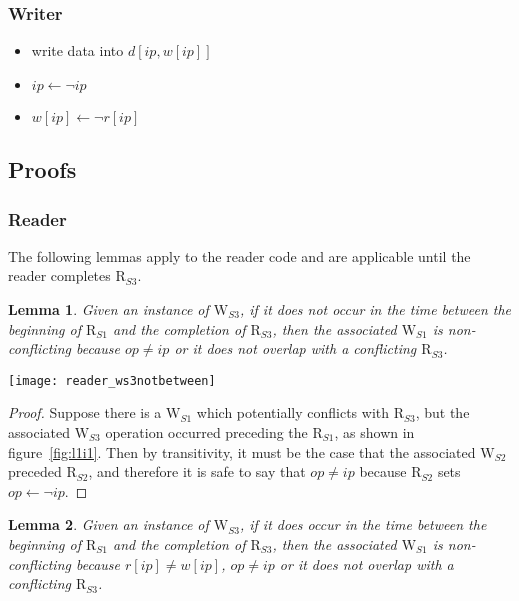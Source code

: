 \documentclass{article}
\newtheorem{lemma}{Lemma}
\newcommand\RS[1]{\ensuremath{\text{R}_{S#1}}}
\newcommand\WS[1]{\ensuremath{\text{W}_{S#1}}}
\newcommand\W[1]{\ensuremath{w\left[#1\right]}}
\newcommand\R[1]{\ensuremath{r\left[#1\right]}}
\newcommand\data[1]{\ensuremath{d\left[#1\right]}}
\newcommand\ip{\ensuremath{ip}}
\newcommand\op{\ensuremath{op}}
\begin{document}
\subsubsection{Writer}
\begin{itemize}
\item[\WS 1] write data into $\data{\ip,\W{\ip}}$
\item[\WS 2] $\ip\gets\neg\ip$
\item[\WS 3] $\W{\ip}\gets\neg{\R{\ip}}$
\end{itemize}

\subsection{Proofs}
\subsubsection{Reader}
The following lemmas apply to the reader code and are applicable until
the reader completes \RS3.

\begin{lemma}\label{lma:ws3notbetween}
  Given an instance of \WS3, if it does not occur in the time between
  the beginning of \RS1 and the completion of \RS3, then the
  associated \WS1 is non-conflicting because $\op\neq\ip$ or it does
  not overlap with a conflicting \RS3.
\end{lemma}

\begin{figure*}[h]
  \centering
  \texttt{[image: reader\_ws3notbetween]}
  \caption{\WS 3 does not occur between \RS 1 and completion of \RS 3}
  \label{fig:l1i1}
\end{figure*}

\begin{proof}
  Suppose there is a \WS1 which potentially conflicts with \RS3, but
  the associated \WS3 operation occurred preceding the \RS1, as shown
  in figure~\ref{fig:l1i1}. Then by transitivity, it must be the case
  that the associated \WS2 preceded \RS2, and therefore it is safe to
  say that $\op\neq\ip$ because \RS2 sets $\op\gets\neg\ip$.
\end{proof}

\begin{lemma}\label{lma:ws3between}
  Given an instance of \WS3, if it does occur in the time between the
  beginning of \RS1 and the completion of \RS3, then the associated
  \WS1 is non-conflicting because $\R{\ip}\neq\W{\ip}$, $\op\neq\ip$
  or it does not overlap with a conflicting \RS3.
\end{lemma}
\end{document}
